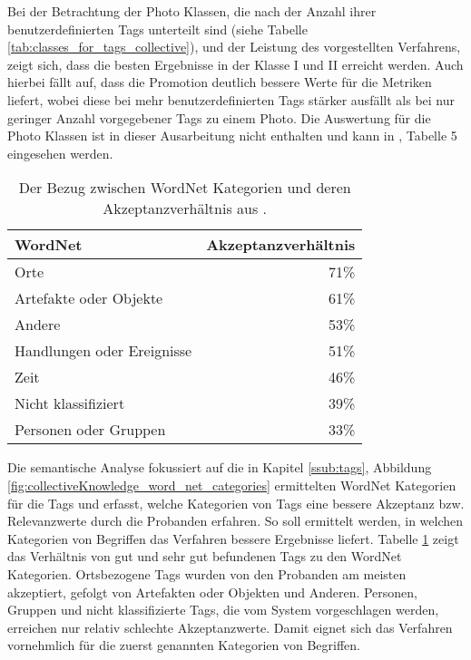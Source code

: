 Bei der Betrachtung der Photo Klassen, die nach der Anzahl ihrer benutzerdefinierten Tags unterteilt sind (siehe Tabelle \ref{tab:classes_for_tags_collective}), und der Leistung des vorgestellten Verfahrens, zeigt sich, dass die besten Ergebnisse in der Klasse I und II erreicht werden. Auch hierbei fällt auf, dass die Promotion deutlich bessere Werte für die Metriken liefert, wobei diese bei mehr benutzerdefinierten Tags stärker ausfällt als bei nur geringer Anzahl vorgegebener Tags zu einem Photo. Die Auswertung für die Photo Klassen ist in dieser Ausarbeitung nicht enthalten und kann in \cite{collectiveKnowledge}, Tabelle 5 eingesehen werden.

\begin{table}[htbp]
  \centering
  \begin{tabular}{lr}
  \hline
  \textbf{WordNet} & \textbf{Akzeptanzverhältnis}\\
  \hline
  Orte & 71\%\\
  \hline
  Artefakte oder Objekte & 61\%\\
  \hline
  Andere & 53\%\\
  \hline
  Handlungen oder Ereignisse & 51\%\\
  \hline
  Zeit & 46\%\\
  \hline
  Nicht klassifiziert & 39\%\\
  \hline
  Personen oder Gruppen & 33\%\\
  \hline
  \end{tabular}
  
  \caption{Der Bezug zwischen WordNet Kategorien und deren Akzeptanzverhältnis aus \cite{collectiveKnowledge}.}
  \label{tab:wordNetResults}
\end{table}

Die semantische Analyse fokussiert auf die in Kapitel \ref{ssub:tags}, Abbildung \ref{fig:collectiveKnowledge_word_net_categories} ermittelten WordNet Kategorien für die Tags und erfasst, welche Kategorien von Tags eine bessere Akzeptanz bzw. Relevanzwerte durch die Probanden erfahren. So soll ermittelt werden, in welchen Kategorien von Begriffen das Verfahren bessere Ergebnisse liefert. Tabelle \ref{tab:wordNetResults} zeigt das Verhältnis von gut und sehr gut befundenen Tags zu den WordNet Kategorien. Ortsbezogene Tags wurden von den Probanden am meisten akzeptiert, gefolgt von Artefakten oder Objekten und Anderen. Personen, Gruppen und nicht klassifizierte Tags, die vom System vorgeschlagen werden, erreichen nur relativ schlechte Akzeptanzwerte. Damit eignet sich das Verfahren vornehmlich für die zuerst genannten Kategorien von Begriffen.

